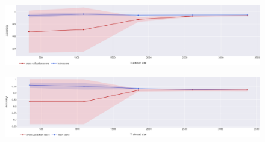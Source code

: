 \begin{figure}[h]
	\centering
	\begin{minipage}{.48\textwidth}
	    \centering
    	\includegraphics[width=\textwidth]{plots/classification/random_forest_learning_curve.png}
    	\label{fig:random_forest_learning_curve}
	\end{minipage}
	\begin{minipage}{.48\textwidth}
	    \centering
		\includegraphics[width=\textwidth]{plots/classification/naive_bayes_learning_curve.png}
    	\label{fig:random_forest_learning_curve}
	\end{minipage}
\end{figure}


